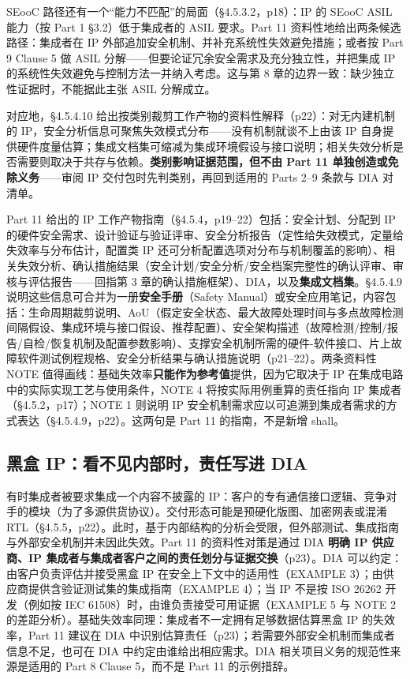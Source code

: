 SEooC 路径还有一个“能力不匹配”的局面（§4.5.3.2，p18）：IP 的 SEooC ASIL 能力（按 Part 1 §3.2）低于集成者的 ASIL 要求。Part 11 资料性地给出两条候选路径：集成者在 IP 外部追加安全机制、并补充系统性失效避免措施；或者按 Part 9 Clause 5 做 ASIL 分解——但要论证冗余安全需求及充分独立性，并把集成 IP 的系统性失效避免与控制方法一并纳入考虑。这与第 8 章的边界一致：缺少独立性证据时，不能据此主张 ASIL 分解成立。

对应地，§4.5.4.10 给出按类别裁剪工作产物的资料性解释（p22）：对无内建机制的 IP，安全分析信息可聚焦失效模式分布——没有机制就谈不上由该 IP 自身提供硬件度量估算；集成文档集可缩减为集成环境假设与接口说明；相关失效分析是否需要则取决于共存与依赖。\textbf{类别影响证据范围，但不由 Part 11 单独创造或免除义务}——审阅 IP 交付包时先判类别，再回到适用的 Parts 2–9 条款与 DIA 对清单。

Part 11 给出的 IP 工作产物指南（§4.5.4，p19–22）包括：安全计划、分配到 IP 的硬件安全需求、设计验证与验证评审、安全分析报告（定性给失效模式，定量给失效率与分布估计，配置类 IP 还可分析配置选项对分布与机制覆盖的影响）、相关失效分析、确认措施结果（安全计划/安全分析/安全档案完整性的确认评审、审核与评估报告——回指第 3 章的确认措施框架）、DIA，以及\textbf{集成文档集}。§4.5.4.9 说明这些信息可合并为一册\textbf{安全手册}（Safety Manual）或安全应用笔记，内容包括：生命周期裁剪说明、AoU（假定安全状态、最大故障处理时间与多点故障检测间隔假设、集成环境与接口假设、推荐配置）、安全架构描述（故障检测/控制/报告/自检/恢复机制及配置参数影响）、支撑安全机制所需的硬件-软件接口、片上故障软件测试例程规格、安全分析结果与确认措施说明（p21–22）。两条资料性 NOTE 值得画线：基础失效率\textbf{只能作为参考值}提供，因为它取决于 IP 在集成电路中的实际实现工艺与使用条件，NOTE 4 将按实际用例重算的责任指向 IP 集成者（§4.5.2，p17）；NOTE 1 则说明 IP 安全机制需求应以可追溯到集成者需求的方式表达（§4.5.4.9，p22）。这两句是 Part 11 的指南，不是新增 shall。

\subsection{黑盒 IP：看不见内部时，责任写进 DIA}

有时集成者被要求集成一个内容不披露的 IP：客户的专有通信接口逻辑、竞争对手的模块（为了多源供货协议）。交付形态可能是预硬化版图、加密网表或混淆 RTL（§4.5.5，p22）。此时，基于内部结构的分析会受限，但外部测试、集成指南与外部安全机制并未因此失效。Part 11 的资料性对策是通过 DIA \textbf{明确 IP 供应商、IP 集成者与集成者客户之间的责任划分与证据交换}（p23）。DIA 可以约定：由客户负责评估并接受黑盒 IP 在安全上下文中的适用性（EXAMPLE 3）；由供应商提供含验证测试集的集成指南（EXAMPLE 4）；当 IP 不是按 ISO 26262 开发（例如按 IEC 61508）时，由谁负责接受可用证据（EXAMPLE 5 与 NOTE 2 的差距分析）。基础失效率同理：集成者不一定拥有足够数据估算黑盒 IP 的失效率，Part 11 建议在 DIA 中识别估算责任（p23）；若需要外部安全机制而集成者信息不足，也可在 DIA 中约定由谁给出相应需求。DIA 相关项目义务的规范性来源是适用的 Part 8 Clause 5，而不是 Part 11 的示例措辞。

